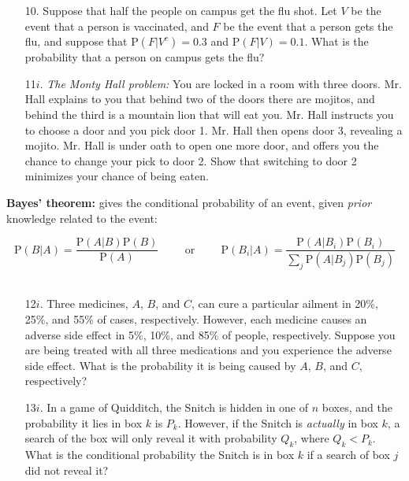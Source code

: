 \documentclass[10pt]{extarticle}
\renewcommand{\P}{\text{P}}
\begin{document}
\hfill 


\begin{itemize}

	\item[10.] Suppose that half the people on campus get the flu shot. Let $V$ be the event that a person is vaccinated, and $F$ be the event that a person gets the flu, and suppose that $\P(F|V^c) = 0.3$ and $\P(F|V) = 0.1$. What is the probability that a person on campus gets the flu? \\ 
	
	\item[11$i$.] {\it The Monty Hall problem:} You are locked in a room with three doors. Mr. Hall explains to you that behind two of the doors there are mojitos, and behind the third is a mountain lion that will eat you. Mr. Hall instructs you to choose a door and you pick door 1. Mr. Hall then opens door 3, revealing a mojito. Mr. Hall is under oath to open one more door, and offers you the chance to change your pick to door 2. Show that switching to door 2 minimizes your chance of being eaten. 

\end{itemize}

\hfill 

{\bf Bayes' theorem:} gives the conditional probability of an event, given {\it prior} knowledge related to the event:

$$\P(B|A) = \frac{\P(A|B) \P(B)}{\P(A)} \hspace{1cm} \text{or} \hspace{1cm}\P(B_i|A) = \frac{\P(A|B_i)\P(B_i)}{\sum_j \P(A|B_j)\P(B_j)}$$ \ 

\begin{itemize}

	\item[12$i$.] Three medicines, $A$, $B$, and $C$, can cure a particular ailment in 20\%, 25\%, and 55\% of cases, respectively. However, each medicine causes an adverse side effect in 5\%, 10\%, and 85\% of people, respectively. Suppose you are being treated with all three medications and you experience the adverse side effect. What is the probability it is being caused by $A$, $B$, and $C$, respectively? \\  

	\item[13$i$.] In a game of Quidditch, the Snitch is hidden in one of $n$ boxes, and the probability it lies in box $k$ is $P_k$. However, if the Snitch is {\it actually} in box $k$, a search of the box will only reveal it with probability $Q_k$, where $Q_k < P_k$. What is the conditional probability the Snitch is in box $k$ if a search of box $j$ did not reveal it? 

\end{itemize} 
\end{document}
